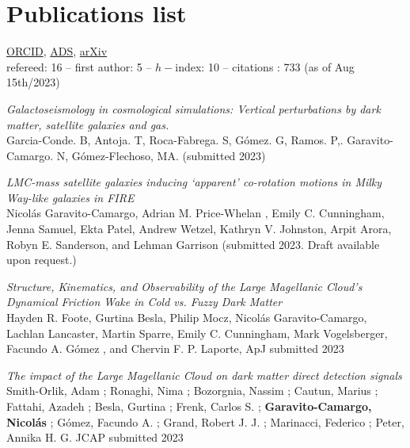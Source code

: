 \documentclass[UTF8]{article}
\begin{document}

\section*{Publications list}



\noindent \href{https://orcid.org/0000-0001-7107-1744}{ORCID},
\href{https://ui.adsabs.harvard.edu/search/q=docs(library%2F0X5_bcuLT4iE-6-Nko0kmg)&sort=date%20desc%2C%20bibcode%20desc&p_=0}{ADS},
\href{https://arxiv.org/search/?query=garavito-camargo&searchtype=all}{arXiv}\\
refereed: 16 -- first author: 5  -- $h-$index: 10 -- citations : 733 (as of Aug 15th/2023) 
\begin{etaremune}
  \setcounter{enumi}{20}


\item \textit{Galactoseismology in cosmological simulations: Vertical
  perturbations by dark matter, satellite galaxies and gas.}\\ Garcia-Conde. B,
  Antoja. T, Roca-Fabrega. S, G\'omez. G, Ramos. P,. Garavito-Camargo. N, G\'omez-Flechoso,
  MA. (submitted 2023)\\ 

\item \textit{LMC-mass satellite galaxies inducing ‘apparent’ co-rotation motions in Milky Way-like galaxies in
FIRE}\\ 
Nicol\'as Garavito-Camargo, Adrian M. Price-Whelan , Emily C. Cunningham, Jenna
Samuel, Ekta Patel, Andrew Wetzel, Kathryn V. Johnston, Arpit Arora, Robyn E.
Sanderson, and Lehman Garrison (submitted 2023. Draft available upon request.) 


\item \textit{Structure, Kinematics, and Observability of the Large Magellanic
  Cloud's Dynamical Friction Wake in Cold vs. Fuzzy Dark Matter}\\
 Hayden R. Foote, Gurtina Besla, Philip Mocz, Nicol\'as Garavito-Camargo,
 Lachlan Lancaster, Martin Sparre, Emily C. Cunningham, Mark Vogelsberger, Facundo A. Gómez , and Chervin F. P. Laporte, ApJ submitted 2023\\


\item \textit{The impact of the Large Magellanic Cloud on dark matter direct detection signals}\\
 Smith-Orlik, Adam ; Ronaghi, Nima ; Bozorgnia, Nassim ; Cautun, Marius ; Fattahi, Azadeh ; Besla, Gurtina ; Frenk, Carlos S. ; \textbf{Garavito-Camargo, Nicol\'as} ; Gómez, Facundo A. ; Grand, Robert J. J. ; Marinacci, Federico ; Peter, Annika H. G. JCAP submitted 2023\\


\end{etaremune}
\end{document}
